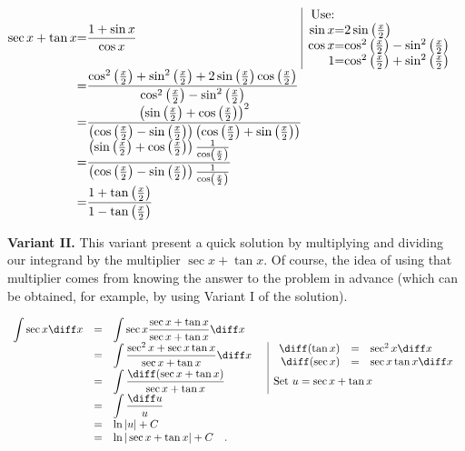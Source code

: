 {$\begin{array}{@{}r@{}c@{}l@{}l@{}|l}
\displaystyle \sec x+\tan x &=&\displaystyle  \frac{1+\sin x}{\cos x}&&\begin{array}{@{}r@{}c@{}l}\text{Use:}\\
\sin x &=& 2\sin \left(\frac{x}{2}\right)\\ \cos x&=& \cos^2 \left(\frac{x}{2}\right) -\sin^2 \left(\frac{x}{2}\right)\\ 1&=&\cos^2 \left(\frac{x}{2}\right)+ \sin^2 \left(\frac{x}{2}\right) \end{array}\\
&=&\displaystyle  \frac{\cos^2\left(\frac{x}{2}\right)+ \sin^2\left(\frac{x}{2}\right)+2\sin \left(\frac{x}{2}\right) \cos \left(\frac{x}{2}\right)}{\cos^2 \left(\frac{x}{2}\right) -\sin^2\left(\frac{x}{2}\right)}\\
&=&\displaystyle \frac{\left(\sin \left(\frac{x}{2}\right)+ \cos\left( \frac{ x}{ 2}\right) \right)^{2}}{ {\left(\cos \left( \frac{ x}{ 2} \right)-\sin \left( \frac{x }{2}\right)\right)} \left(\cos  \left(\frac{x}{2}\right)+\sin \left(\frac{x}{2}\right)\right)}\\
&=&\displaystyle \frac{\left(\sin \left(\frac{x}{2}\right)+ \cos\left( \frac{ x}{ 2}\right) \right)\frac{1}{\cos  \left(\frac{x}{2}\right) } }{ \left(\cos  \left(\frac{x}{2}\right)- \sin \left( \frac{ x}{2} \right)\right)\frac{1}{\cos\left(\frac{x}{2}\right)}}\\
&=&\displaystyle \frac{1+\tan \left(\frac{x}{2} \right)}{1 -\tan\left( \frac{ x}{2} \right)}
\end{array}
$


\textbf{Variant II. } This variant present a quick solution by multiplying and dividing our integrand by the multiplier $\sec x+\tan x$. Of course, the idea of using that multiplier comes from knowing the answer to the problem in advance (which can be obtained, for example, by using Variant I of the solution).

$\begin{array}{rcll|l}
\displaystyle \int \sec x \diff x&=&\displaystyle \int \sec x \frac{\sec x +\tan x }{\sec x+\tan x }\diff x  \\
&=& \displaystyle \int \frac{\sec^2 x+\sec x\tan x }{\sec x +\tan x }\diff x&&
\begin{array}{rcl}
\diff (\tan x )&=&\sec^2 x\diff x\\
\diff (\sec x)&=&\sec x\tan x \diff x
\end{array}\\
&=&\displaystyle  \int \frac{\diff (\sec x+\tan x) }{\sec x +\tan x} &&\text{Set }u=\sec x +\tan x\\
&=&\displaystyle \int \frac{\diff u}{u}\\
&=&\displaystyle \ln |u|+C\\
&=&\displaystyle \ln |\sec x +\tan x|+C\quad .
\end{array}
$

}


